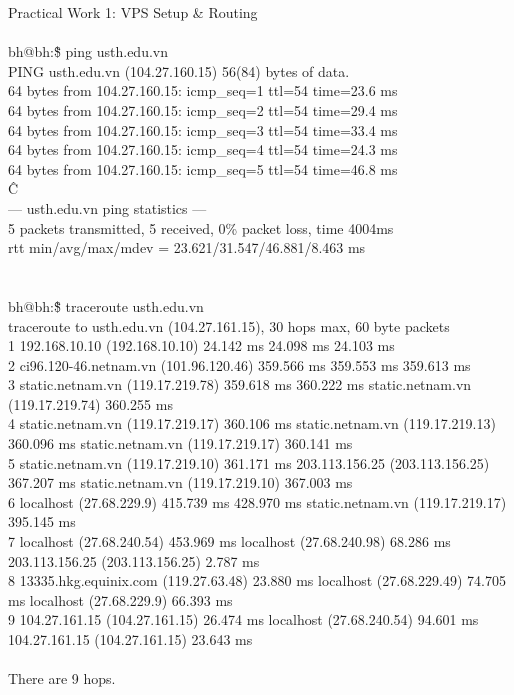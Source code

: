 \documentclass{article}
\begin{document}
Practical Work 1: VPS Setup \& Routing\\ 
\\ 
bh@bh:\~\$ ping usth.edu.vn\\ 
PING usth.edu.vn (104.27.160.15) 56(84) bytes of data.\\ 
64 bytes from 104.27.160.15: icmp\_seq=1 ttl=54 time=23.6 ms\\ 
64 bytes from 104.27.160.15: icmp\_seq=2 ttl=54 time=29.4 ms\\ 
64 bytes from 104.27.160.15: icmp\_seq=3 ttl=54 time=33.4 ms\\ 
64 bytes from 104.27.160.15: icmp\_seq=4 ttl=54 time=24.3 ms\\ 
64 bytes from 104.27.160.15: icmp\_seq=5 ttl=54 time=46.8 ms\\ 
\^C\\ 
--- usth.edu.vn ping statistics ---\\ 
5 packets transmitted, 5 received, 0\% packet loss, time 4004ms\\ 
rtt min/avg/max/mdev = 23.621/31.547/46.881/8.463 ms\\ 
\\ 
\\ 
bh@bh:\~\$ traceroute usth.edu.vn\\ 
traceroute to usth.edu.vn (104.27.161.15), 30 hops max, 60 byte packets\\ 
 1  192.168.10.10 (192.168.10.10)  24.142 ms  24.098 ms  24.103 ms\\ 
 2  ci96.120-46.netnam.vn (101.96.120.46)  359.566 ms  359.553 ms  359.613 ms\\ 
 3  static.netnam.vn (119.17.219.78)  359.618 ms  360.222 ms static.netnam.vn (119.17.219.74)  360.255 ms\\ 
 4  static.netnam.vn (119.17.219.17)  360.106 ms static.netnam.vn (119.17.219.13)  360.096 ms static.netnam.vn (119.17.219.17)  360.141 ms\\ 
 5  static.netnam.vn (119.17.219.10)  361.171 ms 203.113.156.25 (203.113.156.25)  367.207 ms static.netnam.vn (119.17.219.10)  367.003 ms\\ 
 6  localhost (27.68.229.9)  415.739 ms  428.970 ms static.netnam.vn (119.17.219.17)  395.145 ms\\ 
 7  localhost (27.68.240.54)  453.969 ms localhost (27.68.240.98)  68.286 ms 203.113.156.25 (203.113.156.25)  2.787 ms\\ 
 8  13335.hkg.equinix.com (119.27.63.48)  23.880 ms localhost (27.68.229.49)  74.705 ms localhost (27.68.229.9)  66.393 ms\\ 
 9  104.27.161.15 (104.27.161.15)  26.474 ms localhost (27.68.240.54)  94.601 ms 104.27.161.15 (104.27.161.15)  23.643 ms\\ 
\\
 There are 9 hops.\\ 
\end{document}
